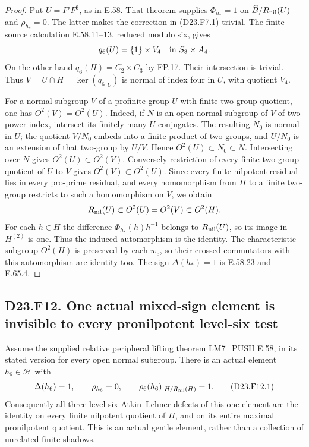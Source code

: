 \begin{proof}
Put $U=F'F^3$, as in E.58.  That theorem supplies
$\Phi_{h_*}=1$ on $\widehat B/R_{\rm nil}(U)$ and
$\rho_{h_*}=0$.  The latter makes the correction in
(D23.F7.1) trivial.
The finite source calculation E.58.11--13, reduced modulo
six, gives
\[
 q_6(U)=\{1\}\times V_4
 \quad\hbox{in }S_3\times A_4.
\]
On the other hand $q_6(H)=C_2\times C_3$ by FP.17.
Their intersection is trivial. Thus
$V=U\cap H=\ker(q_6|_U)$ is normal of index four in $U$,
with quotient $V_4$.

For a normal subgroup $V$ of a profinite group $U$ with
finite two-group quotient, one has $O^2(V)=O^2(U)$.
Indeed, if $N$ is an open normal subgroup of $V$ of
two-power index, intersect its finitely many $U$-conjugates.
The resulting $N_0$ is normal in $U$; the quotient
$V/N_0$ embeds into a finite product of two-groups, and
$U/N_0$ is an extension of that two-group by $U/V$.
Hence $O^2(U)\subset N_0\subset N$. Intersecting over $N$
gives $O^2(U)\subset O^2(V)$.  Conversely restriction of
every finite two-group quotient of $U$ to $V$ gives
$O^2(V)\subset O^2(U)$.
Since every finite nilpotent residual lies in every
pro-prime residual, and every homomorphism from $H$ to a
finite two-group restricts to such a homomorphism on $V$,
we obtain
\[
 R_{\rm nil}(U)\subset O^2(U)=O^2(V)\subset O^2(H).
\]
For each $h\in H$ the difference
$\Phi_{h_*}(h)h^{-1}$ belongs to $R_{\rm nil}(U)$,
so its image in $H^{(2)}$ is one.  Thus the induced
automorphism is the identity.  The characteristic subgroup
$O^2(H)$ is preserved by each $w_e$, so their crossed
commutators with this automorphism are identity too.
The sign $\Delta(h_*)=1$ is E.58.23 and E.65.4.
\end{proof}

\subsection*{D23.F12. One actual mixed-sign element is invisible to every pronilpotent level-six test}
Assume the supplied relative peripheral lifting theorem
LM7\_PUSH E.58, in its stated version for every open normal
subgroup.  There is an actual element $h_6\in\mathcal H$
with
\[
 \Delta(h_6)=1,\qquad\rho_{h_6}=0,
 \qquad \rho_6(h_6)|_{H/R_{\rm nil}(H)}=1.
 \tag{D23.F12.1}
\]
Consequently all three level-six Atkin--Lehner defects of
this one element are the identity on every finite nilpotent
quotient of $H$, and on its entire maximal pronilpotent
quotient.  This is an actual gentle element, rather than
a collection of unrelated finite shadows.

